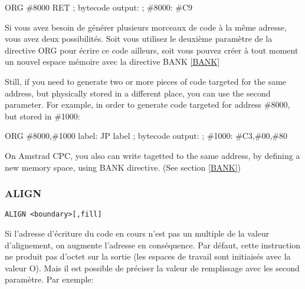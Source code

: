 \begin{code}
ORG \#8000
RET
; bytecode output:
; \#8000: \#C9
\end{code}

\begin{xfr}
  Si vous avez besoin de générer plusieurs morceaux de code à la même adresse, vous avez deux possibilités. Soit vous utilisez le deuxième paramètre de la directive ORG pour écrire ce code ailleurs, soit vous pouvez créer à tout moment un nouvel espace mémoire avec la directive BANK \ref{BANK}
\end{xfr}

\begin{xen}
Still, if you need to generate two or more pieces of code targeted for the same address, but physically stored in a different place, you can use the second parameter.
For example, in order to generate code targeted for address \#8000, but stored in \#1000:
\end{xen}



\begin{code}
ORG \#8000,\#1000
label: JP label
; bytecode output:
; \#1000: \#C3,\#00,\#80
\end{code}

\begin{xen}
On Amstrad CPC, you also can write tagetted to the same address, by defining a new memory space, using BANK directive. (See section \ref{BANK})
\end{xen}

\subsubsection{ALIGN}
\begin{verbatim}
ALIGN <boundary>[,fill]
\end{verbatim}

\begin{xfr}
  Si l'adresse d'écriture du code en cours n'est pas un multiple de la valeur d'alignement, on augmente l'adresse en conséquence. Par défaut, cette instruction ne produit pas d'octet sur la sortie (les espaces de travail sont initiaisés avec la valeur O). Mais il est possible de préciser la valeur de remplissage avec les second paramètre. Par exemple:
\end{xfr}

